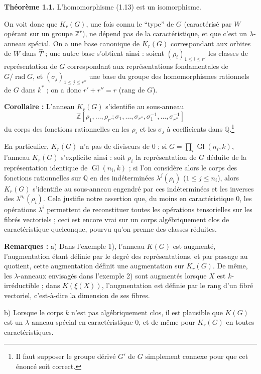 \documentclass[11pt]{article}
\providecommand{\Z}{\mathbb Z}
\providecommand{\Q}{\mathbb Q}
\providecommand{\That}{\widehat T}
\providecommand{\rad}{\operatorname{rad}}
\providecommand{\Gl}{\operatorname{Gl}}
\begin{document}
\textbf{Théorème 1.1.} L'homomorphisme (1.13) est un isomorphisme.

On voit donc que $K_r(G)$, une fois connu le ``type'' de $G$ (caractérisé par $W$ opérant sur un groupe $\Z^r$), ne dépend pas de la caractéristique, et que c'est un $\lambda$-anneau spécial. On a une base canonique de $K_r(G)$ correspondant aux orbites de $W$ dans $\That$ ; une autre base s'obtient ainsi : soient $(\rho_i)_{1\leq i\leq r'}$ les classes de représentation de $G$ correspondant aux représentations fondamentales de $G/\rad G$, et $(\sigma_j)_{1\leq j\leq r''}$ une base du groupe des homomorphismes rationnels de $G$ dans $k^*$ ; on a donc $r'+r''=r$ (rang de $G$).

\textbf{Corollaire :} L'anneau $K_r(G)$ s'identifie au sous-anneau
\[
\Z[\rho_1,\ldots,\rho_{r'};\sigma_1,\ldots,\sigma_{r''},\sigma_1^{-1},\ldots,\sigma_{r''}^{-1}]
\]
du corps des fonctions rationnelles en les $\rho_i$ et les $\sigma_j$ à coefficients dans $\Q$.\footnote{Il faut supposer le groupe dérivé $G'$ de $G$ simplement connexe pour que cet énoncé soit correct.}

En particulier, $K_r(G)$ n'a pas de diviseurs de $0$ ; si $G=\prod_i\Gl(n_i,k)$, l'anneau $K_r(G)$ s'explicite ainsi : soit $\rho_i$ la représentation de $G$ déduite de la représentation identique de $\Gl(n_i,k)$ ; si l'on considère alors le corps des fonctions rationnelles sur $\Q$ en des indéterminées $\lambda^j(\rho_i)$ ($1\leq j\leq n_i$), alors $K_r(G)$ s'identifie au sous-anneau engendré par ces indéterminées et les inverses des $\lambda^{n_i}(\rho_i)$. Cela justifie notre assertion que, du moins en caractéristique $0$, les opérations $\lambda^i$ permettent de reconstituer toutes les opérations tensorielles sur les fibrés vectoriels ; ceci est encore vrai sur un corps algébriquement clos de caractéristique quelconque, pourvu qu'on prenne des classes réduites.

\textbf{Remarques :} a) Dans l'exemple 1), l'anneau $K(G)$ est augmenté, l'augmentation étant définie par le degré des représentations, et par passage au quotient, cette augmentation définit une augmentation sur $K_r(G)$. De même, les $\lambda$-anneaux envisagés dans l'exemple 2) sont augmentés lorsque $X$ est $k$-irréductible ; dans $K(\xi(X))$, l'augmentation est définie par le rang d'un fibré vectoriel, c'est-à-dire la dimension de ses fibres.

b) Lorsque le corps $k$ n'est pas algébriquement clos, il est plausible que $K(G)$ est un $\lambda$-anneau spécial en caractéristique $0$, et de même pour $K_r(G)$ en toutes caractéristiques.
\end{document}

